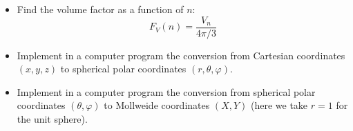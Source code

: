 \documentclass[author-year, prd, amsmath, amssymb, longbibliography, floatfix, reprint, superscriptaddress, a4]{revtex4-1}
\begin{document}
\begin{itemize}
\item Find the volume factor as a function of \(n\):
$$F_{V}(n) = \frac{V_{n}}{4 \pi / 3}$$

\item Implement in a computer program the conversion from Cartesian coordinates \((x, y, z)\) to spherical polar coordinates \((r, \theta, \varphi)\).

\item Implement in a computer program the conversion from spherical polar coordinates \((\theta, \varphi)\) to Mollweide coordinates \((X, Y)\) (here we take \(r = 1\) for the unit sphere).

\end{itemize}
\end{document}
